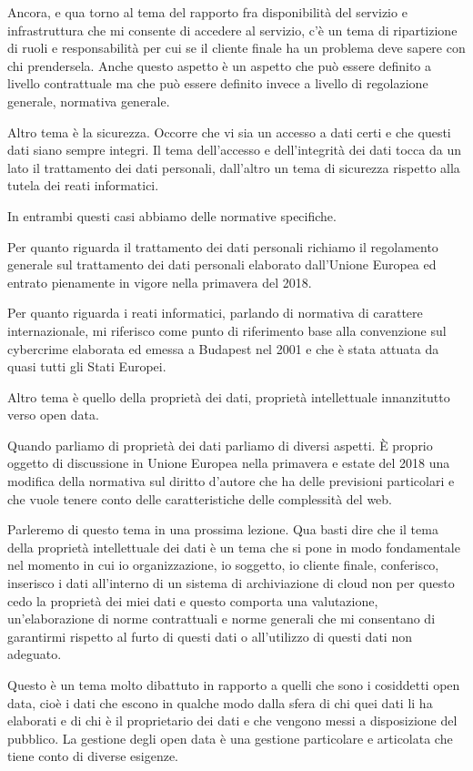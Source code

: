 Ancora, e qua torno al tema del rapporto fra disponibilità del servizio e infrastruttura che mi consente di accedere al servizio, c'è un tema di ripartizione di ruoli e responsabilità per cui se il cliente finale ha un problema deve sapere con chi prendersela. Anche questo aspetto è un aspetto che può essere definito a livello contrattuale ma che può essere definito invece a livello di regolazione generale, normativa generale. 

Altro tema è la sicurezza. Occorre che vi sia un accesso a dati certi e che questi dati siano sempre integri. Il tema dell'accesso e dell'integrità dei dati tocca da un lato il trattamento dei dati personali, dall'altro un tema di sicurezza rispetto alla tutela dei reati informatici.

In entrambi questi casi abbiamo delle normative specifiche. 

Per quanto riguarda il trattamento dei dati personali richiamo il regolamento generale sul trattamento dei dati personali elaborato dall'Unione Europea ed entrato pienamente in vigore nella primavera del 2018. 

Per quanto riguarda i reati informatici, parlando di normativa di carattere internazionale, mi riferisco come punto di riferimento base alla convenzione sul cybercrime elaborata ed emessa a Budapest nel 2001 e che è stata attuata da quasi tutti gli Stati Europei. 

Altro tema è quello della proprietà dei dati, proprietà intellettuale innanzitutto verso open data. 

Quando parliamo di proprietà dei dati parliamo di diversi aspetti. È proprio oggetto di discussione in Unione Europea nella primavera e estate del 2018 una modifica della normativa sul diritto d'autore che ha delle previsioni particolari e che vuole tenere conto delle caratteristiche delle complessità del web. 

Parleremo di questo tema in una prossima lezione. Qua basti dire che il tema della proprietà intellettuale dei dati è un tema che si pone in modo fondamentale nel momento in cui io organizzazione, io soggetto, io cliente finale, conferisco, inserisco i dati all'interno di un sistema di archiviazione di cloud non per questo cedo la proprietà dei miei dati e questo comporta una valutazione, un'elaborazione di norme contrattuali e norme generali che mi consentano di garantirmi rispetto al furto di questi dati o all'utilizzo di questi dati non adeguato. 

Questo è un tema molto dibattuto in rapporto a quelli che sono i cosiddetti open data, cioè i dati che escono in qualche modo dalla sfera di chi quei dati li ha elaborati e di chi è il proprietario dei dati e che vengono messi a disposizione del pubblico. La gestione degli open data è una gestione particolare e articolata che tiene conto di diverse esigenze. 

